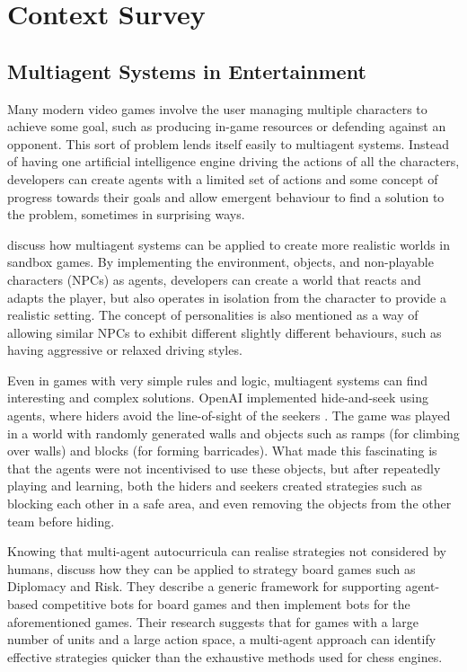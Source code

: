 \documentclass[conference]{IEEEtran}
\begin{document}
\section{Context Survey}

\subsection{Multiagent Systems in Entertainment}

Many modern video games involve the user managing multiple characters to achieve some goal, such as producing in-game resources or defending against an opponent. This sort of problem lends itself easily to multiagent systems. Instead of having one artificial intelligence engine driving the actions of all the characters, developers can create agents with a limited set of actions and some concept of progress towards their goals and allow emergent behaviour to find a solution to the problem, sometimes in surprising ways. 

\cite{sandboxmas} discuss how multiagent systems can be applied to create more realistic worlds in sandbox games. By implementing the environment, objects, and non-playable characters (NPCs) as agents, developers can create a world that reacts and adapts the player, but also operates in isolation from the character to provide a realistic setting. The concept of personalities is also mentioned as a way of allowing similar NPCs to exhibit different slightly different behaviours, such as having aggressive or relaxed driving styles.

Even in games with very simple rules and logic, multiagent systems can find interesting and complex solutions. OpenAI implemented hide-and-seek using agents, where hiders avoid the line-of-sight of the seekers \cite{openaiemergent}. The game was played in a world with randomly generated walls and objects such as ramps (for climbing over walls) and blocks (for forming barricades). What made this fascinating is that the agents were not incentivised to use these objects, but after repeatedly playing and learning, both the hiders and seekers created strategies such as blocking each other in a safe area, and even removing the objects from the other team before hiding.

Knowing that multi-agent autocurricula can realise strategies not considered by humans, \cite{masboardgames} discuss how they can be applied to strategy board games such as Diplomacy and Risk. They describe a generic framework for supporting agent-based competitive bots for board games and then implement bots for the aforementioned games. Their research suggests that for games with a large number of units and a large action space, a multi-agent approach can identify effective strategies quicker than the exhaustive methods used for chess engines. 
\end{document}
